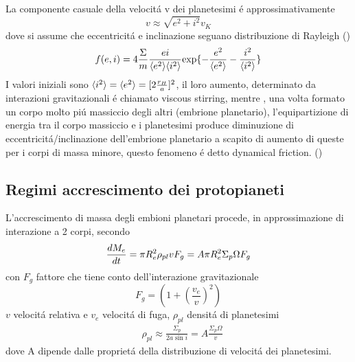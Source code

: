 La componente casuale della velocit\'a v dei planetesimi \'e approssimativamente
\begin{equation}
v\approx\sqrt{e^2+i^2}v_K
\end{equation}
dove si assume che eccentricit\'a e inclinazione seguano distribuzione di Rayleigh (\cite{ida1992n})
\begin{equation}
f(e,i)=4\frac{\Sigma}{m}\frac{ei}{\exv{e^2}\exv{i^2}}\Exp{-\frac{e^2}{\exv{e^2}}-\frac{i^2}{\exv{i^2}}}
\end{equation}
I valori iniziali sono $\exv{i^2}=\exv{e^2}=[2\frac{r_H}{a}]^2$, il loro aumento, determinato da interazioni gravitazionali \'e chiamato viscous stirring, mentre , una volta formato un corpo molto pi\'u massiccio degli altri (embrione planetario), l'equipartizione di energia tra il corpo massiccio e i planetesimi produce diminuzione di eccentricit\'a/inclinazione dell'embrione planetario a scapito di aumento di queste per i corpi di massa minore, questo fenomeno \'e detto dynamical friction. (\cite{kokubo2012dynamics})
 
\subsection{Regimi accrescimento dei protopianeti}

L'accrescimento di massa degli embioni planetari procede, in approssimazione di interazione a 2 corpi, secondo
\begin{equation}
\TDy{t}{M_e}=\pi R_e^2\rho_{pl}v F_g=A\pi R_e^2\Sigma_p\Omega F_g\label{eq:Gaccretionpl}
\end{equation}
con $F_g$ fattore che tiene conto dell'interazione gravitazionale
\begin{equation}
F_g=(1+(\frac{v_e}{v})^2)
\end{equation}
$v$ velocit\'a relativa e $v_e$ velocit\'a di fuga, $\rho_{pl}$ densit\'a di planetesimi
\begin{align}
&\rho_{pl}\approx\frac{\Sigma_p}{2a\sin{i}}=A\frac{\Sigma_p\Omega}{v}
\end{align}
dove A dipende dalle propriet\'a della distribuzione di velocit\'a dei planetesimi.

